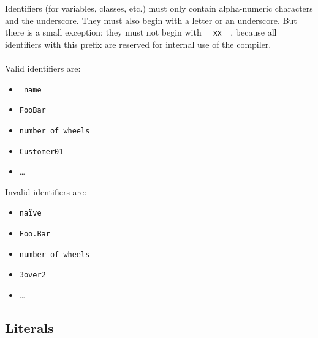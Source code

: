 \documentclass[a5paper]{report}
\begin{document}
Identifiers (for variables, classes, etc.) must only contain alpha-numeric characters and the underscore.
They must also begin with a letter or an underscore. But there is a small exception: they must not begin with
\texttt{\_\_xx\_\_}, because all identifiers with this prefix are reserved for internal use of the compiler. \\ \\
Valid identifiers are:
\begin{itemize}
	\item \texttt{\_name\_}
	\item \texttt{FooBar}
	\item \texttt{number\_of\_wheels}
	\item \texttt{Customer01}
	\item \dots
\end{itemize}
Invalid identifiers are:
\begin{itemize}
	\item \texttt{na\"{i}ve}
	\item \texttt{Foo.Bar}
	\item \texttt{number-of-wheels}
	\item \texttt{3over2}
	\item \dots
\end{itemize}

\subsection{Literals}
\end{document}
